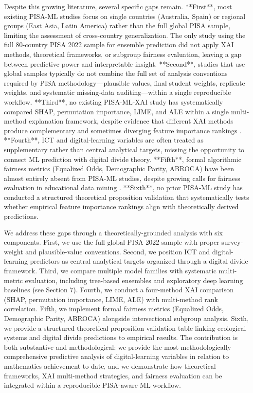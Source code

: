 \documentclass[pdflatex,sn-mathphys-ay]{sn-jnl}
\begin{document}
Despite this growing literature, several specific gaps remain. **First**, most existing PISA-ML studies focus on single countries (Australia, Spain) or regional groups (East Asia, Latin America) rather than the full global PISA sample, limiting the assessment of cross-country generalization. The only study using the full 80-country PISA 2022 sample for ensemble prediction \citep{Oz_Bulut_2025_stacking} did not apply XAI methods, theoretical frameworks, or subgroup fairness evaluation, leaving a gap between predictive power and interpretable insight. **Second**, studies that use global samples typically do not combine the full set of analysis conventions required by PISA methodology---plausible values, final student weights, replicate weights, and systematic missing-data auditing---within a single reproducible workflow. **Third**, no existing PISA-ML-XAI study has systematically compared SHAP, permutation importance, LIME, and ALE within a single multi-method explanation framework, despite evidence that different XAI methods produce complementary and sometimes diverging feature importance rankings \citep{Niu_2025,Nnadi_2024_adaptability}. **Fourth**, ICT and digital-learning variables are often treated as supplementary rather than central analytical targets, missing the opportunity to connect ML prediction with digital divide theory. **Fifth**, formal algorithmic fairness metrics (Equalized Odds, Demographic Parity, ABROCA) have been almost entirely absent from PISA-ML studies, despite growing calls for fairness evaluation in educational data mining \citep{Idowu_2024_debiasing,Verger_2024_MADD}. **Sixth**, no prior PISA-ML study has conducted a structured theoretical proposition validation that systematically tests whether empirical feature importance rankings align with theoretically derived predictions.

We address these gaps through a theoretically-grounded analysis with six components. First, we use the full global PISA 2022 sample with proper survey-weight and plausible-value conventions. Second, we position ICT and digital-learning predictors as central analytical targets organized through a digital divide framework. Third, we compare multiple model families with systematic multi-metric evaluation, including tree-based ensembles and exploratory deep learning baselines (see Section 7). Fourth, we conduct a four-method XAI comparison (SHAP, permutation importance, LIME, ALE) with multi-method rank correlation. Fifth, we implement formal fairness metrics (Equalized Odds, Demographic Parity, ABROCA) alongside intersectional subgroup analysis. Sixth, we provide a structured theoretical proposition validation table linking ecological systems and digital divide predictions to empirical results. The contribution is both substantive and methodological: we provide the most methodologically comprehensive predictive analysis of digital-learning variables in relation to mathematics achievement to date, and we demonstrate how theoretical frameworks, XAI multi-method strategies, and fairness evaluation can be integrated within a reproducible PISA-aware ML workflow.
\end{document}
